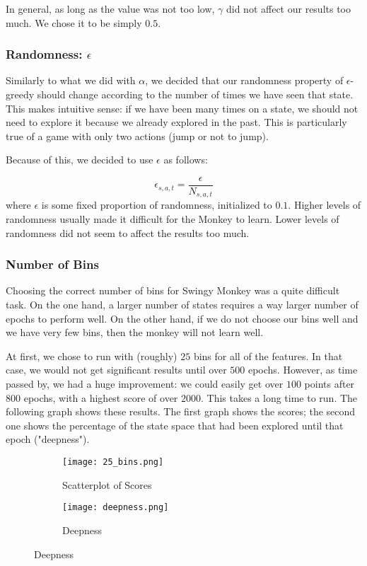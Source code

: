 \documentclass[10pt]{article}
\begin{document}
\medskip

In general, as long as the value was not too low, $\gamma$ did not affect our
results too much. We chose it to be simply $0.5$.

\subsubsection{Randomness: $\epsilon$}

Similarly to what we did with $\alpha$, we decided that our randomness property
of $\epsilon$-greedy should change according to the number of times we have seen
that state. This makes intuitive sense: if we have been many times on a state, we should
not need to explore it because we already explored in the past. This is particularly true
of a game with only two actions (jump or not to jump).

\medskip

Because of this, we decided to use $\epsilon$ as follows:

\[ \epsilon_{s,a,t} = \frac{\epsilon}{N_{s,a,t}} \]
where $\epsilon$ is some fixed proportion of randomness, initialized to $0.1$.
Higher levels of randomness usually made it difficult for the Monkey to learn.
Lower levels of randomness did not seem to affect the results too much.

\subsubsection{Number of Bins}

Choosing the correct number of bins for Swingy Monkey was a quite difficult task.
On the one hand, a larger number of states requires a way larger number of epochs to 
perform well. On the other hand, if we do not choose our bins well and we have very
few bins, then the monkey will not learn well.

\medskip

At first, we chose to run with (roughly) $25$ bins for all of the features. In that case,
we would not get significant results until over $500$ epochs. However, as time passed by,
we had a huge improvement: we could easily get over $100$ points after $800$ epochs,
with a highest score of over $2000$. This takes a long time to run. The following
graph shows these results. The first graph shows the scores; the second one
shows the percentage of the state space that had been explored until that epoch 
("deepness").

\medskip

\begin{figure}[H]
\centering
\begin{subfigure}{.5\textwidth}
  \centering
  \texttt{[image: 25\_bins.png]}
  \caption{Scatterplot of Scores}
\end{subfigure}%
\begin{subfigure}{.5\textwidth}
  \centering
  \texttt{[image: deepness.png]}
  \caption{Deepness}
\end{subfigure}
\end{figure}
\end{document}
